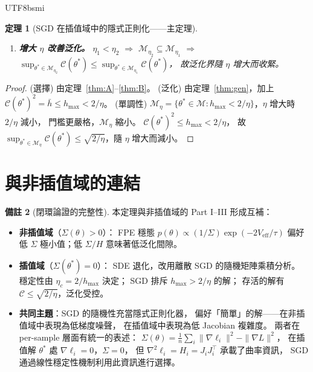 \documentclass[11pt,a4paper]{article}
\newtheorem{theorem}{定理}
\theoremstyle{definition}
\newtheorem{remark}[theorem]{備註}
\newcommand{\cM}{\mathcal{M}}
\newcommand{\cC}{\mathcal{C}}
\begin{document}
\begin{CJK}{UTF8}{bsmi}
\begin{theorem}[SGD 在插值域中的隱式正則化——主定理]
\begin{enumerate}
    \item[\textbf{(單調性)}]
    \textbf{增大 $\eta$ 改善泛化。}
    $\eta_1<\eta_2$ $\Rightarrow$ $\cM_{\eta_2}\subseteq\cM_{\eta_1}$
    $\Rightarrow$ $\sup_{\theta^*\in\cM_{\eta_2}}\cC(\theta^*)
    \leq \sup_{\theta^*\in\cM_{\eta_1}}\cC(\theta^*)$，
    故泛化界隨 $\eta$ 增大而收緊。
  \end{enumerate}
\end{theorem}

\begin{proof}
  (選擇) 由定理~\ref{thm:A}--\ref{thm:B}。
  (泛化) 由定理~\ref{thm:gen}，加上 $\cC(\theta^*)^2=\bar{h}\leq h_{\max}<2/\eta$。
  (單調性) $\cM_\eta=\{\theta^*\in\cM:h_{\max}<2/\eta\}$，$\eta$ 增大時 $2/\eta$ 減小，
  門檻更嚴格，$\cM_\eta$ 縮小。
  $\cC(\theta^*)^2\leq h_{\max}<2/\eta$，
  故 $\sup_{\theta^*\in\cM_\eta}\cC(\theta^*)\leq\sqrt{2/\eta}$，隨 $\eta$ 增大而減小。
\end{proof}

\section{與非插值域的連結}

\begin{remark}[閉環論證的完整性]
  本定理與非插值域的 Part I--III 形成互補：

  \begin{itemize}
    \item \textbf{非插值域}（$\Sigma(\theta)>0$）：
    FPE 穩態 $p(\theta)\propto(1/\Sigma)\exp(-2V_{\mathrm{eff}}/\tau)$
    偏好低 $\Sigma$ 極小值；低 $\Sigma/H$ 意味著低泛化間隙。

    \item \textbf{插值域}（$\Sigma(\theta^*)=0$）：
    SDE 退化，改用離散 SGD 的隨機矩陣乘積分析。
    穩定性由 $\eta_c=2/h_{\max}$ 決定；
    SGD 排斥 $h_{\max}>2/\eta$ 的解；
    存活的解有 $\cC\leq\sqrt{2/\eta}$，泛化受控。

    \item \textbf{共同主題}：SGD 的隨機性充當隱式正則化器，
    偏好「簡單」的解——在非插值域中表現為低梯度噪聲，
    在插值域中表現為低 Jacobian 複雜度。
    兩者在 per-sample 層面有統一的表述：
    $\Sigma(\theta)=\frac{1}{n}\sum_i\|\nabla\ell_i\|^2-\|\nabla L\|^2$，
    在插值解 $\theta^*$ 處 $\nabla\ell_i=0$，$\Sigma=0$，
    但 $\nabla^2\ell_i=H_i=J_iJ_i^\top$ 承載了曲率資訊，
    SGD 通過線性穩定性機制利用此資訊進行選擇。
  \end{itemize}
\end{remark}


\end{CJK}
\end{document}

